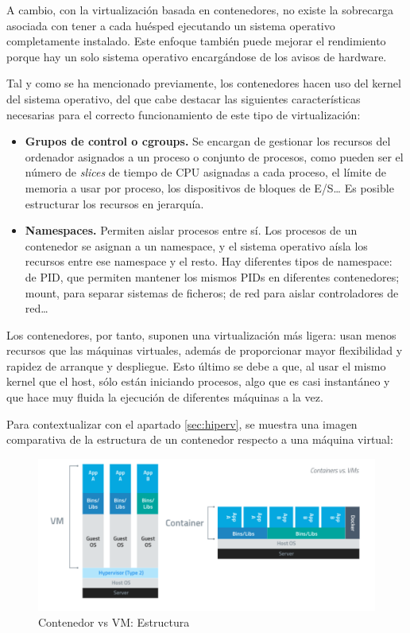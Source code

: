 	A cambio, con la virtualización basada en contenedores, no existe la sobrecarga asociada con tener a cada huésped ejecutando un sistema operativo completamente instalado. Este enfoque también puede mejorar el rendimiento porque hay un solo sistema operativo encargándose de los avisos de hardware.

	Tal y como se ha mencionado previamente, los contenedores hacen uso del kernel del sistema operativo, del que cabe destacar las siguientes características necesarias para el correcto funcionamiento de este tipo de virtualización:~\cite{cont3}

	\begin{itemize}
		\item \textbf{Grupos de control o cgroups.} Se encargan de gestionar los recursos del ordenador asignados a un proceso o conjunto de procesos, como pueden ser el número de \textit{slices} de tiempo de CPU asignadas a cada proceso, el límite de memoria a usar por proceso, los dispositivos de bloques de E/S… Es posible estructurar los recursos en jerarquía.
		\item \textbf{Namespaces.} Permiten aislar procesos entre sí. Los procesos de un contenedor se asignan a un namespace, y el sistema operativo aísla los recursos entre ese namespace y el resto. Hay diferentes tipos de namespace: de PID, que permiten mantener los mismos PIDs en diferentes contenedores; mount, para separar sistemas de ficheros; de red para aislar controladores de red… 
	\end{itemize}

	Los contenedores, por tanto, suponen una virtualización más ligera: usan menos recursos que las máquinas virtuales, además de proporcionar mayor flexibilidad y rapidez de arranque y despliegue. Esto último se debe a que, al usar el mismo kernel que el host, sólo están iniciando procesos, algo que es casi instantáneo y que hace muy fluida la ejecución de diferentes máquinas a la vez.

	Para contextualizar con el apartado \ref{sec:hiperv}, se muestra una imagen comparativa de la estructura de un contenedor respecto a una máquina virtual:

	\begin{figure}[h]
	\centering
	\includegraphics[width=\textwidth]{../imgs/EdA/VMvsCont.png}
	\caption{Contenedor vs VM: Estructura}
	\label{fig:VMvsDocker}
	\end{figure}

